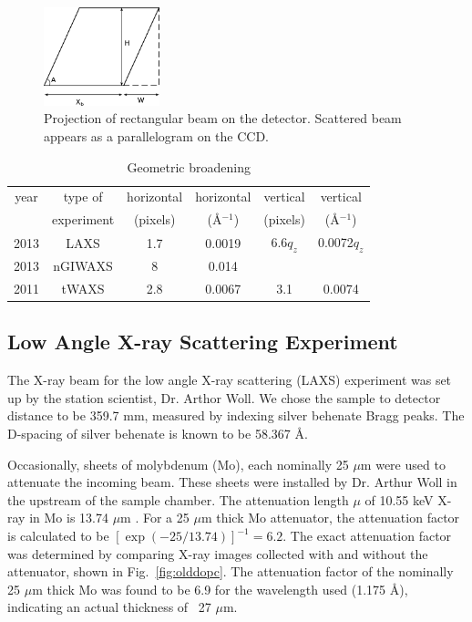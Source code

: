 \begin{figure}[htbp]
  \centering
  \includegraphics[width=0.3\textwidth]{figures/ripple/MMs/transmission/geometric_broadening4}
  \caption{Projection of rectangular beam on the detector. Scattered beam
  appears as a parallelogram on the CCD.}
  \label{fig:gb_trans3}
\end{figure}

\begin{table}[p]
  \centering
  \begin{tabular}{cccccc}
    \hline
    year & type of & horizontal & horizontal & vertical & vertical \\
     & experiment & (pixels) & (\AA$^{-1}$) & (pixels) & (\AA$^{-1}$) \\
    \hline
    2013 & LAXS & 1.7 & 0.0019 & 6.6$q_z$ & 0.0072$q_z$ \\
    2013 & nGIWAXS & 8 & 0.014 &  & \\
    2011 & tWAXS & 2.8 & 0.0067 & 3.1 & 0.0074 \\
    \hline
  \end{tabular}
  \caption{Geometric broadening}
  \label{tab:geometric_broadening}
\end{table}

\newpage
\subsection{Low Angle X-ray Scattering Experiment}\label{sec:LAXS_method}
The X-ray beam for the low angle X-ray scattering (LAXS) experiment 
was set up by the station scientist, Dr. Arthor Woll.
We chose the sample to detector distance to be 359.7 mm, measured by indexing
silver behenate Bragg peaks. The D-spacing of silver behenate is known to be
58.367 \AA.

Occasionally, sheets of molybdenum (Mo), each nominally 25 $\mu$m were 
used to attenuate the incoming beam. 
These sheets were installed by Dr. Arthur Woll in the upstream of the sample chamber.
The attenuation length $\mu$ of 10.55 keV X-ray in Mo is 13.74 $\mu$m \cite{ref:cxro}.
For a 25 $\mu$m thick Mo attenuator, the attenuation factor is calculated to be
$[\exp(-25/13.74)]^{-1} = 6.2$. The exact attenuation factor was determined
by comparing X-ray images collected with and without the attenuator, 
shown in Fig.~\ref{fig:olddopc}.
The attenuation factor of the nominally 25 $\mu$m thick Mo was found to 
be 6.9 for the wavelength used (1.175 \AA), indicating an actual thickness
of ~27 $\mu$m. 

